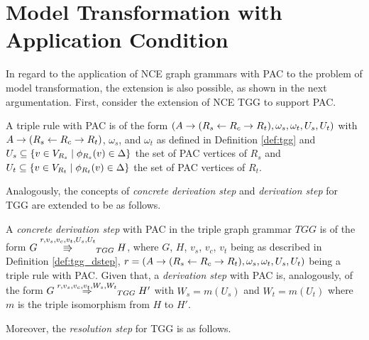 \section{Model Transformation with Application Condition}
In regard to the application of NCE graph grammars with PAC to the problem of model transformation, the extension is also possible, as shown in the next argumentation. First, consider the extension of NCE TGG to support PAC. 

\begin{definition}
	A triple rule with PAC is of the form $(A \to (R_s \overset{}{\leftarrow} R_c \overset{}{\rightarrow} R_t), \omega_s, \omega_t, U_s, U_t)$ with $A \to (R_s \overset{}{\leftarrow} R_c \overset{}{\rightarrow} R_t)$, $\omega_s$, and $\omega_t$ as defined in Definition \ref{def:tgg} and $U_s \subseteq \{v \in V_{R_s} \; | \; \phi_{R_s}(v) \in \Delta\}$ the set of PAC vertices of $R_s$ and $U_t \subseteq \{v \in V_{R_t} \; | \; \phi_{R_t}(v) \in \Delta\}$ the set of PAC vertices of $R_t$.
\end{definition}

Analogously, the concepts of \textit{concrete derivation step} and \textit{derivation step} for TGG are extended to be as follows.

\begin{definition}
 A \textit{concrete derivation step} with PAC in the triple graph grammar $TGG$ is of the form $G \overset{r,v_s,v_c,v_t,U_s,U_t}{\Rrightarrow}_{TGG} H$, where $G$, $H$, $v_s$, $v_c$, $v_t$ being as described in Definition \ref{def:tgg_dstep}, $r = (A \to (R_s \overset{}{\leftarrow} R_c \overset{}{\rightarrow} R_t), \omega_s, \omega_t, U_s, U_t)$ being a triple rule with PAC. Given that, a \textit{derivation step} with PAC is, analogously, of the form $G \overset{r,v_s,v_c,v_t,W_s,W_t}{\Rightarrow}_{TGG} H'$ with $W_s = m(U_s)$ and $W_t = m(U_t)$ where $m$ is the triple isomorphism from $H$ to $H'$.
\end{definition}

Moreover, the \textit{resolution step} for TGG is as follows.

